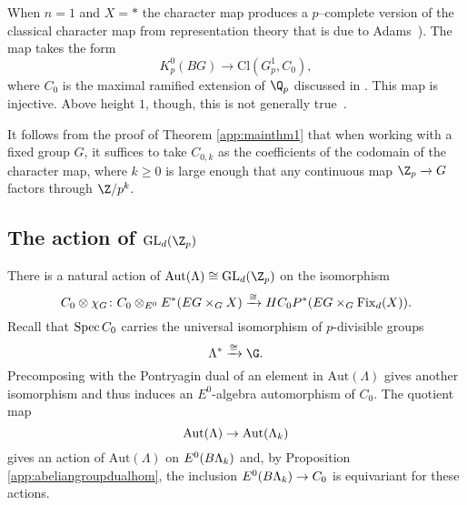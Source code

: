 


\begin{example}
When \(n=1\) and \(X = *\) the character map produces a \(p\)--complete version of the classical character map from representation theory that is due to Adams~\cite[Section 2]{AdamsClassifyingSpacesII}). The map takes the form
\[
K_{p}^{0}(BG) \xrightarrow{} \mathrm{Cl}(G_{p}^{1}, C_0),
\]
where \(C_0\) is the maximal ramified extension of \(\Q_p\) discussed in . This map is injective. Above height \(1\), though, this is not generally true~\cite{Kriz}.
\end{example}

\begin{remark}
It follows from the proof of Theorem \ref{app:mainthm1} that when working with a fixed group \(G\), it suffices to take \(C_{0,k}\) as the coefficients of the codomain of the character map, where \(k \geq 0\) is large enough that any continuous map \(\Z_p \xrightarrow{} G\) factors through \(\Z/p^k\).
\end{remark}

\subsection{The action of \(\mathrm{GL}_d(\Z_p)\)}

There is a natural action of \(\mathrm{Aut}(\Lambda) \cong \mathrm{GL}_d(\Z_p)\) on the isomorphism
\[
C_0 \otimes \chi_G \colon C_0 \otimes_{E^0} E^*(EG \times_G X) \xrightarrow{\cong} HC_{0}P^{*}(EG \times_G \operatorname{Fix}_d(X)).
\]
Recall that \(\operatorname{Spec} C_0\) carries the universal isomorphism of \(p\)-divisible groups
\[
\Lambda^* \xrightarrow{\cong} \G.
\]
Precomposing with the Pontryagin dual of an element in \(\mathrm{Aut}(\Lambda)\) gives another isomorphism and thus induces an \(E^0\)-algebra automorphism of \(C_0\). The quotient map
\[
\mathrm{Aut}(\Lambda) \to \mathrm{Aut}(\Lambda_k)
\]  
gives an action of \(\mathrm{Aut}(\Lambda)\) on \(E^0(B\Lambda_k)\) and, by Proposition \ref{app:abeliangroupdualhom}, the inclusion \(E^0(B\Lambda_k) \to C_0\) is equivariant for these actions.

